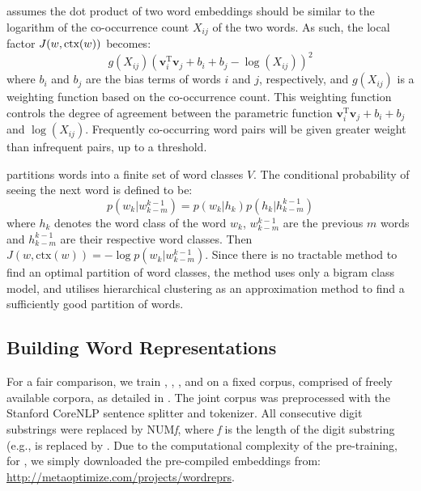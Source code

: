\Glove assumes the dot product of two word embeddings should be similar
to the logarithm of the co-occurrence count $X_{ij}$ of the two
words. As such, the local factor $J(w, \text{ctx}(w))$ becomes:
\begin{displaymath}
g(X_{ij}) (\mathbf{v}_i^{\text{T}} \mathbf{v}_j + b_i + b_j - \log(X_{ij}))^2
\end{displaymath}
where $b_i$ and $b_j$ are the bias terms of words $i$ and $j$,
respectively, and $g(X_{ij})$ is a weighting function based on the
co-occurrence count. This weighting function controls the degree of
agreement between the parametric function $\mathbf{v}_i^{\text{T}}
\mathbf{v}_j + b_i + b_j $ and $\log(X_{ij})$. Frequently co-occurring
word pairs will be given greater weight than infrequent
pairs, up to a threshold.

\brown partitions words into a finite set of word classes $V$. The
conditional probability of seeing the next word is defined to be:
\begin{displaymath}
p(w_k | w_{k - m}^{k -1}) = p(w_k | h_k) p(h_k | h_{k - m}^{k -1})
\end{displaymath}
where $h_k$ denotes the word class of the word $w_k$, $w_{k - m}^{k -1}$
are the previous $m$ words and $h_{k - m}^{k -1}$ are their respective
word classes. Then $J(w, \text{ctx}(w)) = - \log p(w_k | w_{k - m}^{k
  -1}) $. Since there is no tractable method to find an optimal
partition of word classes, the method uses only a bigram class model, and utilises hierarchical clustering as an approximation method to find a sufficiently good partition of words. 



\subsection{Building Word Representations}
\label{buildingWordRep}

For a fair comparison, we train \brown, \CBOW, \Skipgram, and \Glove on
a fixed corpus, comprised of freely available corpora, as detailed in
. The joint corpus was preprocessed with the
Stanford CoreNLP sentence splitter and tokenizer. All consecutive digit
substrings were replaced by NUM\textit{f}, where \textit{f} is the
length of the digit substring (e.g.,  is replaced by
. Due to the computational complexity of the
pre-training, for \CW, we simply downloaded the pre-compiled embeddings from:
\url{http://metaoptimize.com/projects/wordreprs}.


